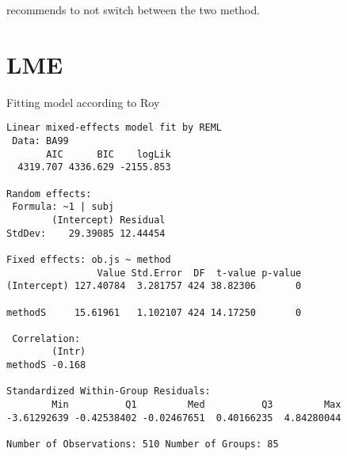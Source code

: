 \documentclass[12pt, a4paper]{article}
\theoremstyle{plain}
\theoremstyle{definition}
\theoremstyle{remark}
\begin{document}
\citet{haber}

\citet{roy} recommends to not switch between the two method.

\section{LME}

Fitting model according to Roy

\newpage
\begin{verbatim}
Linear mixed-effects model fit by REML
 Data: BA99
       AIC      BIC    logLik
  4319.707 4336.629 -2155.853

Random effects:
 Formula: ~1 | subj
        (Intercept) Residual
StdDev:    29.39085 12.44454

Fixed effects: ob.js ~ method
                Value Std.Error  DF  t-value p-value
(Intercept) 127.40784  3.281757 424 38.82306       0

methodS     15.61961   1.102107 424 14.17250       0

 Correlation:
        (Intr)
methodS -0.168

Standardized Within-Group Residuals:
        Min          Q1         Med          Q3         Max
-3.61292639 -0.42538402 -0.02467651  0.40166235  4.84280044

Number of Observations: 510 Number of Groups: 85

\end{verbatim}

\newpage

\end{document}
